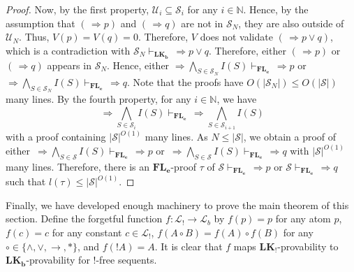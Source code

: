 \documentclass[12pt,a4paper]{article}
\theoremstyle{plain}
\theoremstyle{definition}
\newcommand{\LKb}{\mathbf{LK_b}}
\newcommand{\LKajab}{\mathbf{LK_!}}
\begin{document}
\begin{proof}
Now, by the first property, $\mathcal{U}_i \subseteq \mathcal{S}_i$ for any $i \in \mathbb{N}$. Hence, by the assumption that $(\, \Rightarrow p)$ and $(\, \Rightarrow q)$ are not in $\mathcal{S}_N$, they are also outside of $\mathcal{U}_N$. Thus, $V(p)=V(q)=0$. Therefore, $V$ does not validate $(\, \Rightarrow p \vee q)$, which is a contradiction with $\mathcal{S}_N \vdash_{\LKb} \, \Rightarrow p \vee q$. Therefore, either $(\, \Rightarrow p)$ or $(\, \Rightarrow q)$ appears in $\mathcal{S}_N$. Hence, either $\Rightarrow \bigwedge_{S \in \mathcal{S}_N} I(S) \vdash_{\mathbf{FL_e}} \, \Rightarrow p$ or $\Rightarrow \bigwedge_{S \in \mathcal{S}_N} I(S) \vdash_{\mathbf{FL_e}} \, \Rightarrow q$. Note that the proofs have $O(|\mathcal{S}_N|)\leq O(|\mathcal{S}|)$ many lines.
By the fourth property, for any $i \in \mathbb{N}$, we have 
\[
\, \Rightarrow \bigwedge_{S \in \mathcal{S}_i} I(S) \vdash_{\mathbf{FL_e}} \, \Rightarrow \bigwedge_{S \in \mathcal{S}_{i+1}} I(S)
\]
with a proof containing $|\mathcal{S}|^{O(1)}$ many lines. As $N \leq |\mathcal{S}|$, we obtain a proof of either $\, \Rightarrow \bigwedge_{S \in \mathcal{S}} I(S) \vdash_{\mathbf{FL_e}} \, \Rightarrow p$ or $\, \Rightarrow \bigwedge_{S \in \mathcal{S}} I(S) \vdash_{\mathbf{FL_e}} \, \Rightarrow q$ with $|\mathcal{S}|^{O(1)}$ many lines. Therefore, there is an $\mathbf{FL_e}$-proof $\tau$ of $\mathcal{S} \vdash_{\mathbf{FL_e}} \, \Rightarrow p$ or $\mathcal{S} \vdash_{\mathbf{FL_e}} \, \Rightarrow q$ such that $l(\tau) \leq |\mathcal{S}|^{O(1)}$.
\end{proof}

Finally, we have developed enough machinery to prove the main theorem of this section. Define the forgetful function $f:\mathcal{L}_! \to \mathcal{L}_b$ by $f(p)=p$ for any atom $p$, $f(c)=c$ for any constant $c \in \mathcal{L}_!$, $f(A \circ B)=f(A) \circ f(B)$ for any $\circ \in \{\wedge, \vee, \to, *\}$, and $f(!A)=A$. It is clear that $f$ maps $\LKajab$-provability to $\LKb$-provability for $!$-free sequents.
\end{document}
